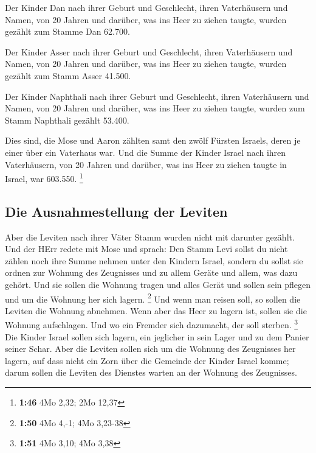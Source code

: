  Der Kinder Dan nach ihrer Geburt und Geschlecht, ihren
Vaterhäusern und Namen, von 20 Jahren und darüber, was ins Heer zu
ziehen taugte,  wurden gezählt zum Stamme Dan 62.700.

 Der Kinder Asser nach ihrer Geburt und Geschlecht, ihren
Vaterhäusern und Namen, von 20 Jahren und darüber, was ins Heer zu
ziehen taugte,  wurden gezählt zum Stamm Asser 41.500.

 Der Kinder Naphthali nach ihrer Geburt und Geschlecht,
ihren Vaterhäusern und Namen, von 20 Jahren und darüber, was ins Heer zu
ziehen taugte,  wurden zum Stamm Naphthali gezählt
53.400.

 Dies sind, die Mose und Aaron zählten samt den zwölf
Fürsten Israels, deren je einer über ein Vaterhaus war. 
Und die Summe der Kinder Israel nach ihren Vaterhäusern, von 20 Jahren
und darüber, was ins Heer zu ziehen taugte in Israel, 
war 603.550. \footnote{\textbf{1:46} 4Mo 2,32; 2Mo 12,37}

\hypertarget{die-ausnahmestellung-der-leviten}{%
\subsection{Die Ausnahmestellung der
Leviten}\label{die-ausnahmestellung-der-leviten}}

 Aber die Leviten nach ihrer Väter Stamm wurden nicht mit
darunter gezählt.  Und der HErr redete mit Mose und
sprach:  Den Stamm Levi sollst du nicht zählen noch ihre
Summe nehmen unter den Kindern Israel,  sondern du sollst
sie ordnen zur Wohnung des Zeugnisses und zu allem Geräte und allem, was
dazu gehört. Und sie sollen die Wohnung tragen und alles Gerät und
sollen sein pflegen und um die Wohnung her sich lagern. \footnote{\textbf{1:50}
  4Mo 4,-1; 4Mo 3,23-38}  Und wenn man reisen soll, so
sollen die Leviten die Wohnung abnehmen. Wenn aber das Heer zu lagern
ist, sollen sie die Wohnung aufschlagen. Und wo ein Fremder sich
dazumacht, der soll sterben. \footnote{\textbf{1:51} 4Mo 3,10; 4Mo 3,38}
 Die Kinder Israel sollen sich lagern, ein jeglicher in
sein Lager und zu dem Panier seiner Schar.  Aber die
Leviten sollen sich um die Wohnung des Zeugnisses her lagern, auf dass
nicht ein Zorn über die Gemeinde der Kinder Israel komme; darum sollen
die Leviten des Dienstes warten an der Wohnung des Zeugnisses.


